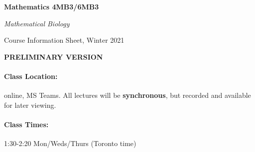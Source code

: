 \documentclass[12pt]{article}
\newcommand{\url}[1]{{\tt\textcolor{blue}{#1}}}
\begin{document}

{\Large\parindent=0pt

{\bfseries Mathematics 4MB3/6MB3

{\slshape Mathematical Biology}

Course Information Sheet, Winter 2021

\textbf{PRELIMINARY VERSION}

}}

\bigskip

\leftline{{\bf Web page:} \url{http://www.math.mcmaster.ca/bolker}}

\bigskip
{}

\paragraph*{Class Location:} online, MS Teams. All lectures will be \textbf{synchronous}, but recorded and available for later viewing.

\paragraph*{Class Times:} 1:30-2:20 Mon/Weds/Thurs (Toronto time)
\end{document}
